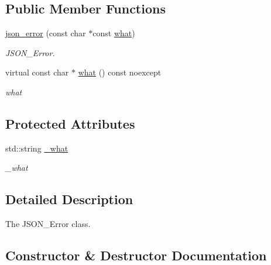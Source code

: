 \subsection*{Public Member Functions}
\begin{DoxyCompactItemize}
\item 
\hyperlink{classformat_1_1json__error_ad5f0a824e997a04144759e2e914bee96}{json\+\_\+error} (const char $\ast$const \hyperlink{classformat_1_1json__error_ad485f2d9233498b1a66695f94e313dd5}{what})
\begin{DoxyCompactList}\small\item\em J\+S\+O\+N\+\_\+\+Error. \end{DoxyCompactList}\item 
virtual const char $\ast$ \hyperlink{classformat_1_1json__error_ad485f2d9233498b1a66695f94e313dd5}{what} () const noexcept
\begin{DoxyCompactList}\small\item\em what \end{DoxyCompactList}\end{DoxyCompactItemize}
\subsection*{Protected Attributes}
\begin{DoxyCompactItemize}
\item 
std\+::string \hyperlink{classformat_1_1json__error_a7d924b7e8cacd89885cee0a398baaa6a}{\+\_\+what}\hypertarget{classformat_1_1json__error_a7d924b7e8cacd89885cee0a398baaa6a}{}\label{classformat_1_1json__error_a7d924b7e8cacd89885cee0a398baaa6a}

\begin{DoxyCompactList}\small\item\em \+\_\+what \end{DoxyCompactList}\end{DoxyCompactItemize}


\subsection{Detailed Description}
The J\+S\+O\+N\+\_\+\+Error class. 

\subsection{Constructor \& Destructor Documentation}
